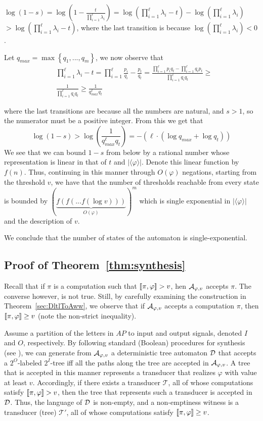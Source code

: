 \documentclass{llncs}
\newcommand{\set}[1]{{\left\{#1\right\}}}
\newcommand{\zug}[1]{\langle #1  \rangle}
\newcommand{\T}{{\mathcal T}}
\newcommand{\D}{{\cal D}}
\newcommand{\A}{{\cal A}}
\renewcommand{\phi}{\varphi}
\begin{document}
$\log(1-s)=\log(1-\frac{t}{\prod_{i=1}^{\ell} \lambda_i})=\log (\prod_{i=1}^{\ell}\lambda_i-t)-\log(\prod_{i=1}^{\ell}\lambda_i)$ $>\log (\prod_{i=1}^{\ell}\lambda_i-t)$,
where the last transition is because $\log(\prod_{i=1}^{\ell}\lambda_i)<0$.

Let $q_{max}=\max\set{q_1,...,q_m}$, we now observe that
\begin{align*}
&\prod_{i=1}^{\ell}\lambda_i-t=\prod_{i=1}^{\ell}\frac{p_i}{q_i}-\frac{p_t}{q_t}=
\frac{\prod_{i=1}^{\ell}p_iq_t- \prod_{i=1}^{\ell}q_ip_t}{\prod_{i=1}^{\ell} q_iq_t}\ge\\  
&\frac{1}{\prod_{i=1}^{\ell} q_iq_t}\ge \frac{1}{q_{max}^{\ell }q_t}
\end{align*}

where the last transitions are because all the numbers are natural, and $s>1$, so the numerator must be a positive integer.
From this we get that
$$\log(1-s)>\log\left( \frac{1}{q_{max}^{\ell }q_t}\right)=-(\ell\cdot (\log q_{max}+\log q_t))$$
We see that we can bound $1-s$ from below by a rational number whose representation is linear in that of $t$ and $|\zug{\phi}|$. Denote this linear function by $f(n)$.
Thus, continuing in this manner through $O(\phi)$ negations, starting from the threshold $v$, we have that the number of thresholds reachable from every state is bounded by
$(\underbrace{f(f(...f(\log v)))}_{O(\varphi)})^m$
which is single exponential in $|\zug{\varphi}|$ and the description of $v$.

We conclude that the number of states of the automaton is single-exponential.


\subsection{Proof of Theorem~\ref{thm:synthesis}}
\label{apx: synthesis}
Recall that if $\pi$ is a computation such that $\sem{\pi,\phi}>v$, hen $\A_{\phi,v}$ accepts $\pi$. The converse however, is not true. Still, by carefully examining the construction in Theorem~\ref{sec:DltlToAww}, we observe that if $\A_{\phi,v}$ accepts a computation $\pi$, then $\sem{\pi,\phi}\ge v$ (note the non-strict inequality). 

Assume a partition of the letters in $AP$ to input and output signals, denoted $I$ and $O$, respectively. By following standard (Boolean) procedures for synthesis (see \cite{PR89a}), we can generate from $\A_{\phi,v}$ a deterministic tree automaton $\D$ that accepts a $2^O$-labeled $2^I$-tree iff all the paths along the tree are accepted in $\A_{\phi,v}$. A tree that is accepted in this manner represents a transducer that realizes $\phi$ with value at least $v$. Accordingly, if there exists a transducer $\T$, all of whose computations satisfy $\sem{\pi,\phi}>v$, then the tree that represents such a transducer is accepted in $\D$. Thus, the language of $\D$ is non-empty, and a non-emptiness witness is a transducer (tree) $\T'$, all of whose computations 
satisfy $\sem{\pi,\phi}\ge v$.
\end{document}
